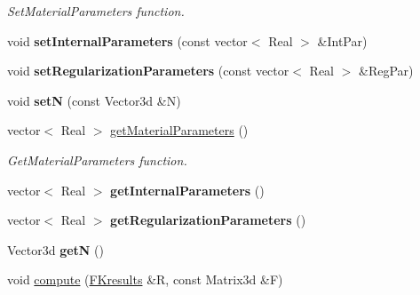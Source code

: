\begin{DoxyCompactItemize}
\begin{DoxyCompactList}\small\item\em SetMaterialParameters function. \item\end{DoxyCompactList}\item 
\hypertarget{classvoom_1_1_pass_myo_a_a413a68f64bd4b31f7f31762b371ce168}{
void {\bfseries setInternalParameters} (const vector$<$ Real $>$ \&IntPar)}
\label{classvoom_1_1_pass_myo_a_a413a68f64bd4b31f7f31762b371ce168}

\item 
\hypertarget{classvoom_1_1_pass_myo_a_afd21cbc27fb5bdb9c13b476fb9d31e71}{
void {\bfseries setRegularizationParameters} (const vector$<$ Real $>$ \&RegPar)}
\label{classvoom_1_1_pass_myo_a_afd21cbc27fb5bdb9c13b476fb9d31e71}

\item 
\hypertarget{classvoom_1_1_pass_myo_a_ac6dc9750c1d049b37d1cf966c176c704}{
void {\bfseries setN} (const Vector3d \&N)}
\label{classvoom_1_1_pass_myo_a_ac6dc9750c1d049b37d1cf966c176c704}

\item 
\hypertarget{classvoom_1_1_pass_myo_a_a63cdaa267f12644f0bfb370e8edb437a}{
vector$<$ Real $>$ \hyperlink{classvoom_1_1_pass_myo_a_a63cdaa267f12644f0bfb370e8edb437a}{getMaterialParameters} ()}
\label{classvoom_1_1_pass_myo_a_a63cdaa267f12644f0bfb370e8edb437a}

\begin{DoxyCompactList}\small\item\em GetMaterialParameters function. \item\end{DoxyCompactList}\item 
\hypertarget{classvoom_1_1_pass_myo_a_a8c64a85541b9b3d7ddfbc2af457c6f7d}{
vector$<$ Real $>$ {\bfseries getInternalParameters} ()}
\label{classvoom_1_1_pass_myo_a_a8c64a85541b9b3d7ddfbc2af457c6f7d}

\item 
\hypertarget{classvoom_1_1_pass_myo_a_a21875f4e7fcc512d2a7d1e82d9528d02}{
vector$<$ Real $>$ {\bfseries getRegularizationParameters} ()}
\label{classvoom_1_1_pass_myo_a_a21875f4e7fcc512d2a7d1e82d9528d02}

\item 
\hypertarget{classvoom_1_1_pass_myo_a_ab3842dbeef9ba766067e5e6307a96aec}{
Vector3d {\bfseries getN} ()}
\label{classvoom_1_1_pass_myo_a_ab3842dbeef9ba766067e5e6307a96aec}

\item 
\hypertarget{classvoom_1_1_pass_myo_a_ab35459b2c4fc26eccf86a039c28c1150}{
void \hyperlink{classvoom_1_1_pass_myo_a_ab35459b2c4fc26eccf86a039c28c1150}{compute} (\hyperlink{structvoom_1_1_mechanics_material_1_1_f_kresults}{FKresults} \&R, const Matrix3d \&F)}
\label{classvoom_1_1_pass_myo_a_ab35459b2c4fc26eccf86a039c28c1150}


\end{DoxyCompactItemize}
